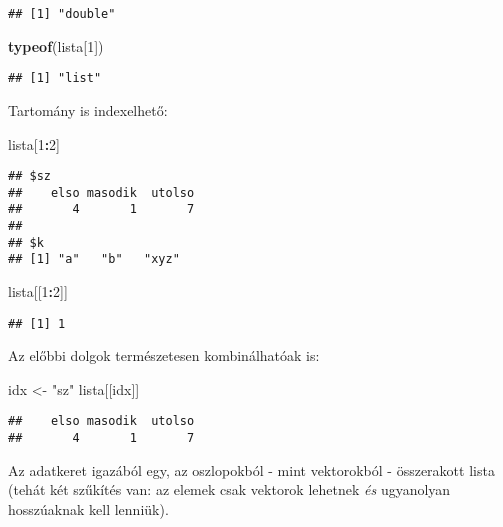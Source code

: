 \documentclass[]{book}
\newenvironment{Shaded}{\begin{snugshade}}{\end{snugshade}}
\newcommand{\KeywordTok}[1]{\textcolor[rgb]{0.13,0.29,0.53}{\textbf{#1}}}
\newcommand{\DecValTok}[1]{\textcolor[rgb]{0.00,0.00,0.81}{#1}}
\newcommand{\StringTok}[1]{\textcolor[rgb]{0.31,0.60,0.02}{#1}}
\newcommand{\OperatorTok}[1]{\textcolor[rgb]{0.81,0.36,0.00}{\textbf{#1}}}
\newcommand{\NormalTok}[1]{#1}
\begin{document}
\begin{verbatim}
## [1] "double"
\end{verbatim}

\begin{Shaded}
\begin{Highlighting}[]
\KeywordTok{typeof}\NormalTok{(lista[}\DecValTok{1}\NormalTok{])}
\end{Highlighting}
\end{Shaded}

\begin{verbatim}
## [1] "list"
\end{verbatim}

Tartomány is indexelhető:

\begin{Shaded}
\begin{Highlighting}[]
\NormalTok{lista[}\DecValTok{1}\OperatorTok{:}\DecValTok{2}\NormalTok{]}
\end{Highlighting}
\end{Shaded}

\begin{verbatim}
## $sz
##    elso masodik  utolso 
##       4       1       7 
## 
## $k
## [1] "a"   "b"   "xyz"
\end{verbatim}

\begin{Shaded}
\begin{Highlighting}[]
\NormalTok{lista[[}\DecValTok{1}\OperatorTok{:}\DecValTok{2}\NormalTok{]]}
\end{Highlighting}
\end{Shaded}

\begin{verbatim}
## [1] 1
\end{verbatim}

Az előbbi dolgok természetesen kombinálhatóak is:

\begin{Shaded}
\begin{Highlighting}[]
\NormalTok{idx <-}\StringTok{ "sz"}
\NormalTok{lista[[idx]]}
\end{Highlighting}
\end{Shaded}

\begin{verbatim}
##    elso masodik  utolso 
##       4       1       7
\end{verbatim}

Az adatkeret igazából egy, az oszlopokból - mint vektorokból -
összerakott lista (tehát két szűkítés van: az elemek csak vektorok
lehetnek \emph{és} ugyanolyan hosszúaknak kell lenniük).
\end{document}
